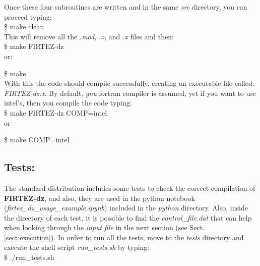 Once these four subroutines are written and in the same {\it src} directory, you can proceed typing:\\

\$ make clean\\

This will remove all the {\it *.mod}, {\it *.o}, and {\it *.x} files and then:\\

\$ make FIRTEZ-dz\\

or:

\$ make\\

With this the code should compile successfully, creating an executable file called: {\it FIRTEZ-dz.x}. By default, {\it gnu} fortran compiler is assumed, yet if you want to use intel's, then you compile the code typing:\\

\$ make FIRTEZ-dz COMP=intel\\

or

\$ make COMP=intel\\

%
%
\subsection{Tests:}

The standard distribution includes some tests to check the correct compilation of {\bf FIRTEZ-dz}, and also, they are used in the python notebook ({\it firtez\_dz\_usage\_example.ipynb}) included in the {\it python} directory. Also, inside the directory of each test, it is possible to find the {\it control\_file.dat} that can help when looking through the {\it input file} in the next section (see Sect. \ref{sect:execution}). In order to run all the tests, move to the {\it tests} directory and execute the shell script {\it run\_tests.sh} by typing:\\

\$ ./run\_tests.sh

%
